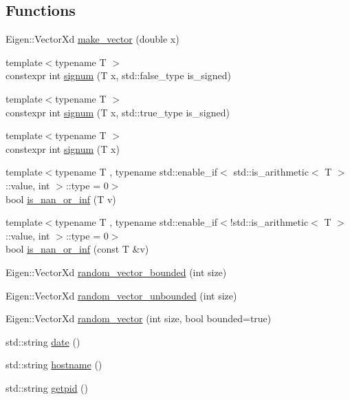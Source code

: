 \subsection*{Functions}
\begin{DoxyCompactItemize}
\item 
Eigen\+::\+Vector\+Xd \hyperlink{group__tools_ga029807776f0b7f44f806e4f9d92e34e7}{make\+\_\+vector} (double x)
\item 
{\footnotesize template$<$typename T $>$ }\\constexpr int \hyperlink{namespacelimbo_1_1tools_ac56ad2bccc403ffa8341394f2fc28cda}{signum} (T x, std\+::false\+\_\+type is\+\_\+signed)
\item 
{\footnotesize template$<$typename T $>$ }\\constexpr int \hyperlink{namespacelimbo_1_1tools_a5e6d3a39db3c143a271eac9625f9779e}{signum} (T x, std\+::true\+\_\+type is\+\_\+signed)
\item 
{\footnotesize template$<$typename T $>$ }\\constexpr int \hyperlink{group__tools_ga156cca8d927600da93054c952247857b}{signum} (T x)
\item 
{\footnotesize template$<$typename T , typename std\+::enable\+\_\+if$<$ std\+::is\+\_\+arithmetic$<$ T $>$\+::value, int $>$\+::type  = 0$>$ }\\bool \hyperlink{group__tools_gabcb0caa2ffabd42fa865c9ab0b624681}{is\+\_\+nan\+\_\+or\+\_\+inf} (T v)
\item 
{\footnotesize template$<$typename T , typename std\+::enable\+\_\+if$<$!std\+::is\+\_\+arithmetic$<$ T $>$\+::value, int $>$\+::type  = 0$>$ }\\bool \hyperlink{group__tools_gaf4ca69df04108670f0cc61e4a8ae7367}{is\+\_\+nan\+\_\+or\+\_\+inf} (const T \&v)
\item 
Eigen\+::\+Vector\+Xd \hyperlink{group__tools_ga15dc04885b7309c7ca794db2429fb3f2}{random\+\_\+vector\+\_\+bounded} (int size)
\item 
Eigen\+::\+Vector\+Xd \hyperlink{group__tools_ga0f1d777d8e14733853ffc5df7068246f}{random\+\_\+vector\+\_\+unbounded} (int size)
\item 
Eigen\+::\+Vector\+Xd \hyperlink{group__tools_ga4db74517a1dead8a92f2f1482de106b8}{random\+\_\+vector} (int size, bool bounded=true)
\item 
std\+::string \hyperlink{group__tools_gafb48d3271e7423f8b8d94599869bd9cb}{date} ()
\item 
std\+::string \hyperlink{group__tools_ga4810ffa502d791d6ad750739a953f56f}{hostname} ()
\item 
std\+::string \hyperlink{group__tools_ga4ee13d198367d07cabd37316e671db09}{getpid} ()
\end{DoxyCompactItemize}


